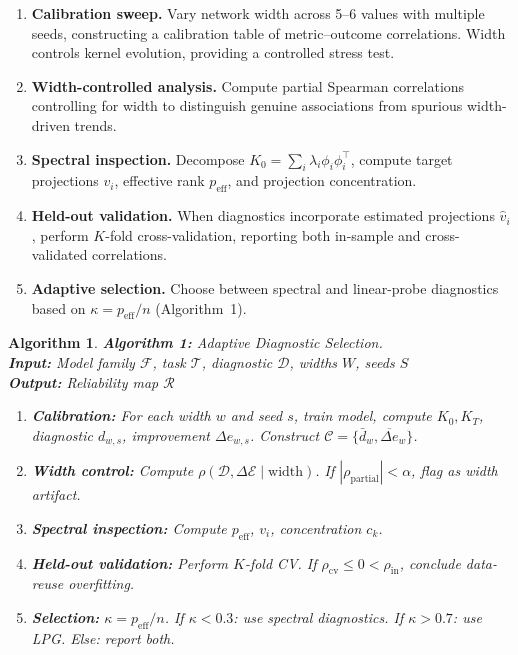 \documentclass[twoside,11pt]{article}
\newtheorem{algorithm}{Algorithm}
\begin{document}
\begin{enumerate}
    \item \textbf{Calibration sweep.} Vary network width across 5--6 values with multiple seeds, constructing a calibration table of metric--outcome correlations. Width controls kernel evolution, providing a controlled stress test.
    \item \textbf{Width-controlled analysis.} Compute partial Spearman correlations controlling for width to distinguish genuine associations from spurious width-driven trends.
    \item \textbf{Spectral inspection.} Decompose $K_0 = \sum_i \lambda_i \phi_i \phi_i^\top$, compute target projections $v_i$, effective rank $p_{\text{eff}}$, and projection concentration.
    \item \textbf{Held-out validation.} When diagnostics incorporate estimated projections $\hat{v}_i$, perform $K$-fold cross-validation, reporting both in-sample and cross-validated correlations.
    \item \textbf{Adaptive selection.} Choose between spectral and linear-probe diagnostics based on $\kappa = p_{\text{eff}} / n$ (Algorithm~1).
\end{enumerate}

\begin{algorithm}
\label{alg:selection}
\small
\textbf{Algorithm 1:} Adaptive Diagnostic Selection. \\
\textbf{Input:} Model family $\mathcal{F}$, task $\mathcal{T}$, diagnostic $\mathcal{D}$, widths $W$, seeds $S$ \\
\textbf{Output:} Reliability map $\mathcal{R}$

\begin{enumerate}
    \item \textbf{Calibration:} For each width $w$ and seed $s$, train model, compute $K_0,K_T$, diagnostic $d_{w,s}$, improvement $\Delta e_{w,s}$. Construct $\mathcal{C} = \{\bar{d}_w, \overline{\Delta e}_w\}$.
    \item \textbf{Width control:} Compute $\rho(\mathcal{D}, \Delta\mathcal{E} \mid \text{width})$. If $|\rho_{\text{partial}}| < \alpha$, flag as width artifact.
    \item \textbf{Spectral inspection:} Compute $p_{\text{eff}}$, $v_i$, concentration $c_k$.
    \item \textbf{Held-out validation:} Perform $K$-fold CV. If $\rho_{\text{cv}} \leq 0 < \rho_{\text{in}}$, conclude data-reuse overfitting.
    \item \textbf{Selection:} $\kappa = p_{\text{eff}} / n$. If $\kappa < 0.3$: use spectral diagnostics. If $\kappa > 0.7$: use LPG. Else: report both.
\end{enumerate}
\end{algorithm}
\end{document}
